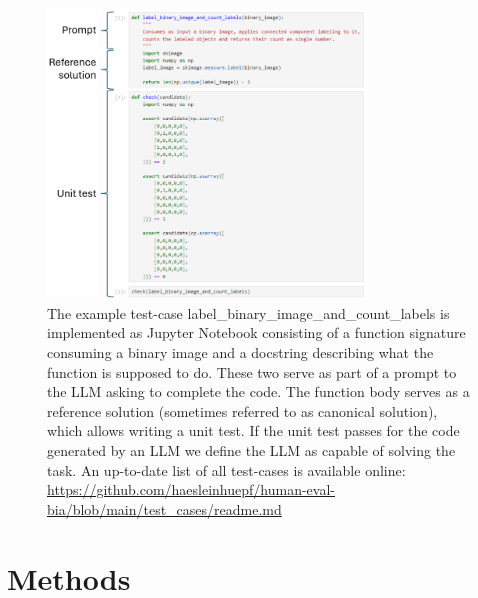 \documentclass{ecai}
\begin{document}
\begin{figure}[h]
    \centering
    \includegraphics[width=8.5cm]{example_test_case.png}
    \caption{The example test-case label\_binary\_image\_and\_count\_labels is implemented as Jupyter Notebook consisting of a function signature consuming a binary image and a docstring describing what the function is supposed to do. These two serve as part of a prompt to the LLM asking to complete the code. The function body serves as a reference solution (sometimes referred to as canonical solution), which allows writing a unit test. If the unit test passes for the code generated by an LLM we define the LLM as capable of solving the task. An up-to-date list of all test-cases is available online: 
    \url{https://github.com/haesleinhuepf/human-eval-bia/blob/main/test_cases/readme.md}
    \newline
    \newline
    }
    \label{fig:exampletestcase}
    \end{figure}


\section{Methods}
\end{document}
